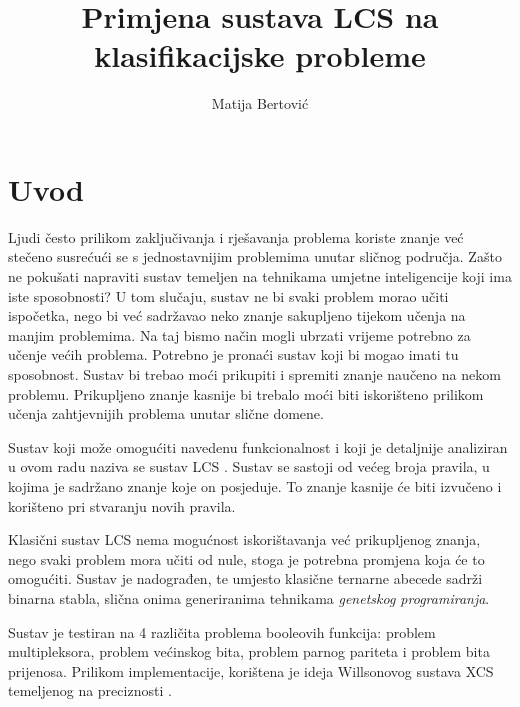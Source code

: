 \documentclass[times, utf8, zavrsni]{fer}
\begin{document}

\title{Primjena sustava LCS na klasifikacijske probleme}

\author{Matija Bertović}

\maketitle

\izvornik

\zahvala{}

\tableofcontents

\chapter{Uvod}
Ljudi često prilikom zaključivanja i rješavanja problema koriste znanje već stečeno susrećući se s jednostavnijim problemima unutar sličnog područja.
Zašto ne pokušati napraviti sustav temeljen na tehnikama umjetne inteligencije koji ima iste sposobnosti?
U tom slučaju, sustav ne bi svaki problem morao učiti ispočetka, nego bi već sadržavao neko znanje sakupljeno tijekom učenja na manjim problemima.
Na taj bismo način mogli ubrzati vrijeme potrebno za učenje većih problema.
Potrebno je pronaći sustav koji bi mogao imati tu sposobnost.
Sustav bi trebao moći prikupiti i spremiti znanje naučeno na nekom problemu.
Prikupljeno znanje kasnije bi trebalo moći biti iskorišteno prilikom učenja zahtjevnijih problema unutar slične domene.

Sustav koji može omogućiti navedenu funkcionalnost i koji je detaljnije analiziran u ovom radu naziva se sustav LCS .
Sustav se sastoji od većeg broja pravila, u kojima je sadržano znanje koje on posjeduje.
To znanje kasnije će biti izvučeno i korišteno pri stvaranju novih pravila.

Klasični sustav LCS nema mogućnost iskorištavanja već prikupljenog znanja, nego svaki problem mora učiti od nule, stoga je potrebna promjena koja će to omogućiti.
Sustav je nadograđen, te umjesto klasične ternarne abecede sadrži binarna stabla, slična onima generiranima tehnikama \emph{genetskog programiranja}.

Sustav je testiran na 4 različita problema booleovih funkcija: problem multipleksora, problem većinskog bita, problem parnog pariteta i problem bita prijenosa.
Prilikom implementacije, korištena je ideja Willsonovog sustava XCS temeljenog na preciznosti \citep{2}.
\end{document}

